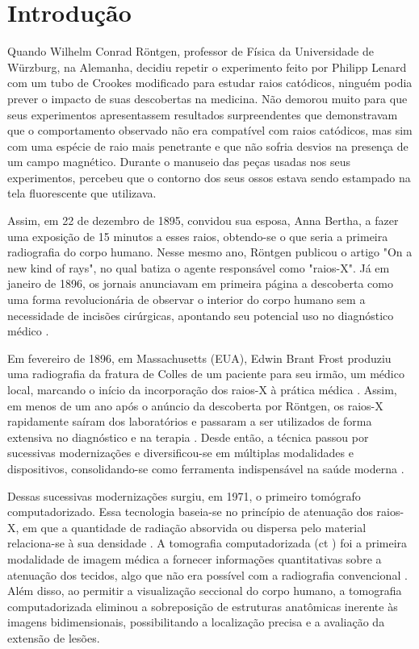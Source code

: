 
\chapter{Introdução}
\label{chap:introducao}

Quando Wilhelm Conrad Röntgen, professor de Física da Universidade de Würzburg, na Alemanha, decidiu repetir o experimento feito por Philipp Lenard com um tubo de Crookes modificado para estudar raios catódicos, ninguém podia prever o impacto de suas descobertas na medicina.
Não demorou muito para que seus experimentos apresentassem resultados surpreendentes que demonstravam que o comportamento observado não era compatível com raios catódicos, mas sim com uma espécie de raio mais penetrante e que não sofria desvios na presença de um campo magnético. Durante o manuseio das peças usadas nos seus experimentos, percebeu que o contorno dos seus ossos estava sendo estampado na tela fluorescente que utilizava.

Assim, em 22 de dezembro de 1895, convidou sua esposa, Anna Bertha, a fazer uma exposição de 15 minutos a esses raios, obtendo-se o que seria a primeira radiografia do corpo humano. Nesse mesmo ano, Röntgen publicou o artigo "On a new kind of rays"\cite{RoentgenOnNewKind1896}, no qual batiza o agente responsável como "raios-X". Já em janeiro de 1896, os jornais anunciavam em primeira página a descoberta como uma forma revolucionária de observar o interior do corpo humano sem a necessidade de incisões cirúrgicas, apontando seu potencial uso no diagnóstico médico \cite{okunoFisicaRadiacoes2010}.

Em fevereiro de 1896, em Massachusetts (EUA), Edwin Brant Frost produziu uma radiografia da fratura de Colles de um paciente para seu irmão, um médico local, marcando o início da incorporação dos raios-X à prática médica \cite{November81895}. Assim, em menos de um ano após o anúncio da descoberta por Röntgen, os raios-X rapidamente saíram dos laboratórios e passaram a ser utilizados de forma extensiva no diagnóstico e na terapia \cite{November81895}. Desde então, a técnica passou por sucessivas modernizações e diversificou-se em múltiplas modalidades e dispositivos, consolidando-se como ferramenta indispensável na saúde moderna \cite{howellEARLYCLINICALUSE2016, taylorIlluminatingHealthEvolution2023}.

Dessas sucessivas modernizações surgiu, em 1971, o primeiro tomógrafo computadorizado. Essa tecnologia baseia-se no princípio de atenuação dos raios-X, em que a quantidade de radiação absorvida ou dispersa pelo material relaciona-se à sua densidade \cite{valiUnveilingMarvelsComputed2024, noorOverviewComputedTomography2023}.
A tomografia computadorizada (\acrshort{ct} ) foi a primeira modalidade de imagem médica a fornecer informações quantitativas sobre a atenuação dos tecidos, algo que não era possível com a radiografia convencional \cite{schulzHowCTHappened2021}. Além disso, ao permitir a visualização seccional do corpo humano, a tomografia computadorizada eliminou a sobreposição de estruturas anatômicas inerente às imagens bidimensionais, possibilitando a localização precisa e a avaliação da extensão de lesões\cite{schulzHowCTHappened2021}.

